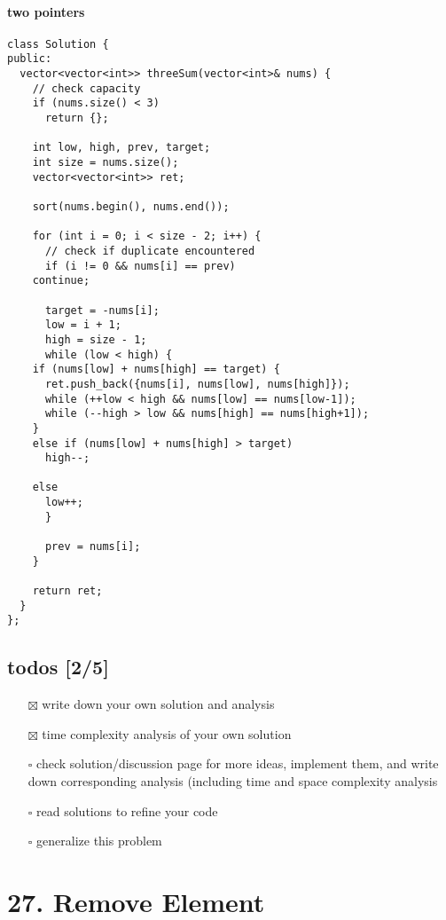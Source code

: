 \documentclass[11pt]{article}
\begin{document}
\paragraph{two pointers}
\label{sec:org52d2518}
\begin{verbatim}
class Solution {
public:
  vector<vector<int>> threeSum(vector<int>& nums) {
    // check capacity 
    if (nums.size() < 3)
      return {};

    int low, high, prev, target;
    int size = nums.size();
    vector<vector<int>> ret;

    sort(nums.begin(), nums.end());

    for (int i = 0; i < size - 2; i++) {
      // check if duplicate encountered
      if (i != 0 && nums[i] == prev)
	continue;

      target = -nums[i];
      low = i + 1;
      high = size - 1;
      while (low < high) {
	if (nums[low] + nums[high] == target) {
	  ret.push_back({nums[i], nums[low], nums[high]});
	  while (++low < high && nums[low] == nums[low-1]);
	  while (--high > low && nums[high] == nums[high+1]);
	}
	else if (nums[low] + nums[high] > target)
	  high--;

	else
	  low++;
      }

      prev = nums[i];
    }

    return ret;
  }
};
\end{verbatim}
\subsection{todos [2/5]}
\label{sec:org47a12d2}
\begin{itemize}
\item[{$\boxtimes$}] write down your own solution and analysis
\item[{$\boxtimes$}] time complexity analysis of your own solution
\item[{$\square$}] check solution/discussion page for more ideas, implement them, and write down corresponding analysis (including time and space complexity analysis
\item[{$\square$}] read solutions to refine your code
\item[{$\square$}] generalize this problem
\end{itemize}
\section{27. Remove Element \label{org4d20947}}
\label{sec:orgb7ebff3}
\end{document}

